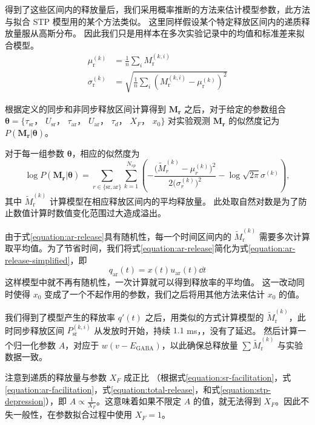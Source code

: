 得到了这些区间内的释放量后，我们采用概率推断的方法来估计模型参数，此方法与拟合 STP 模型用的某个方法类似\cite{Costa2013}。
这里同样假设某个特定释放区间内的递质释放量服从高斯分布。
因此我们只是用样本在多次实验记录中的均值和标准差来拟合模型。
\begin{align}
\mu_\text{r}^{(k)} &= \frac{1}{n} \sum_i M_\text{r}^{(k,i)} \\
\sigma_\text{r}^{(k)} &= \sqrt{\frac{1}{n}\sum_i\left( M_\text{r}^{(k,i)} - \mu_\text{r}^{(k)} \right)^2}
\label{equation:statistics-for-fitting}
\end{align}

根据定义的同步和非同步释放区间计算得到 $\bm{M_\text{r}}$ 之后，对于给定的参数组合 $\bm{\theta} = \{\tau_\text{sr}$，
$U_\text{sr}$， $\tau_\text{ar}$， $U_\text{ar}$， $\tau_d$， $X_F$， $x_0 \}$ 对实验观测 $\bm{M_\text{r}}$ 的似然度记为 $P\left(\bm{M_\text{r}}\left|\bm{\theta}\right.\right)$。

对于每一组参数 $\bm{\theta}$，相应的似然度为
\begin{equation}
 \log P\left(\bm{M_\text{r}}\left|\bm{\theta}\right.\right) = \sum_{r \in
    \{\text{sr}, \text{ar}\}}
  \sum_{k=1}^{N_{sp}} \left(-\frac{\big(\tilde{M}_{r}^{(k)}-\mu_{r}^{(k)}\big)^2}{2\big(\sigma_r^{(k)}\big)^2}
- \log\sqrt{2\pi}\sigma^{(k)} \right),
\label{equation:probabilistic-inference-log}
\end{equation}
其中 $\tilde{M}_\text{r}^{(k)}$ 计算模型在相应释放区间内的平均释放量。
此处取自然对数是为了防止数值计算时数值变化范围过大造成溢出。

由于式\ref{equation:ar-release}具有随机性，每一个时间区间内的 $\tilde{M}_\text{r}^{(k)}$ 需要多次计算取平均值。为了节省时间，我们将式\ref{equation:ar-release}简化为式\ref{equation:ar-release-simplified}，即
\begin{equation*}
q_\text{ar}(t) = x(t) u_\text{ar}(t)\dd{t}
\end{equation*}
这样模型中就不再有随机性，一次计算就可以得到释放率的平均值。
这一改动同时使得 $x_0$ 变成了一个不起作用的参数，我们之后将用其他方法来估计 $x_0$ 的值。

我们得到了模型产生的释放率 $q'(t)$ 之后，用类似的方式计算模型的 $\tilde{M}_\text{r}^{(k)}$，此时同步释放区间 $P_\text{sr}^{(k,i)}$ 从发放时开始，持续 $1.1$ ms，，没有了延迟。
然后计算一个归一化参数 $A$，对应于 $w(v-E_\text{GABA})$，以此确保总释放量 $\sum \tilde{M}_\text{r}^{(k)}$ 与实验数据一致。

注意到递质的释放量与参数 $X_F$ 成正比 （根据式\ref{equation:sr-facilitation}，式\ref{equation:ar-facilitation}，式\ref{equation:total-release}，和式\ref{equation:stp-depression}），即 $A \propto \frac{1}{X_F}$。这意味着如果不限定 $A$ 的值，就无法得到 $X_F$。因此不失一般性，在参数拟合过程中使用 $X_F = 1$。

